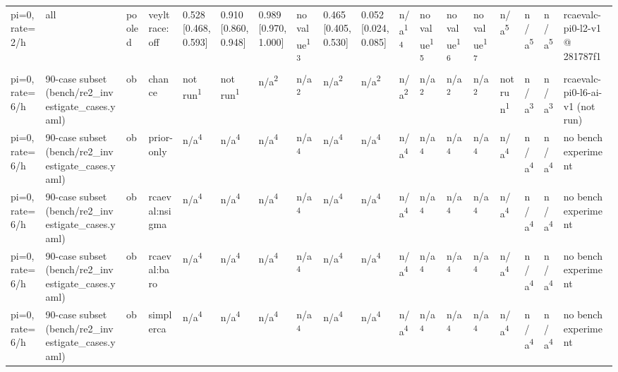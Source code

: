 \begin{table}[t]
\begin{tabular}{llllllllllllllllll}
pi=0, rate=2/h & all & pooled & veyltrace:off & 0.528 [0.468, 0.593] & 0.910 [0.860, 0.948] & 0.989 [0.970, 1.000] & no value\textsuperscript{13} & 0.465 [0.405, 0.530] & 0.052 [0.024, 0.085] & n/a\textsuperscript{14} & no value\textsuperscript{15} & no value\textsuperscript{16} & no value\textsuperscript{17} & n/a\textsuperscript{5} & n/a\textsuperscript{5} & n/a\textsuperscript{5} & rcaevalc-pi0-l2-v1 @ 281787f1 \\
pi=0, rate=6/h & 90-case subset (bench/re2\_investigate\_cases.yaml) & ob & chance & not run\textsuperscript{1} & not run\textsuperscript{1} & n/a\textsuperscript{2} & n/a\textsuperscript{2} & n/a\textsuperscript{2} & n/a\textsuperscript{2} & n/a\textsuperscript{2} & n/a\textsuperscript{2} & n/a\textsuperscript{2} & n/a\textsuperscript{2} & not run\textsuperscript{1} & n/a\textsuperscript{3} & n/a\textsuperscript{3} & rcaevalc-pi0-l6-ai-v1 (not run) \\
pi=0, rate=6/h & 90-case subset (bench/re2\_investigate\_cases.yaml) & ob & prior-only & n/a\textsuperscript{4} & n/a\textsuperscript{4} & n/a\textsuperscript{4} & n/a\textsuperscript{4} & n/a\textsuperscript{4} & n/a\textsuperscript{4} & n/a\textsuperscript{4} & n/a\textsuperscript{4} & n/a\textsuperscript{4} & n/a\textsuperscript{4} & n/a\textsuperscript{4} & n/a\textsuperscript{4} & n/a\textsuperscript{4} & no bench experiment \\
pi=0, rate=6/h & 90-case subset (bench/re2\_investigate\_cases.yaml) & ob & rcaeval:nsigma & n/a\textsuperscript{4} & n/a\textsuperscript{4} & n/a\textsuperscript{4} & n/a\textsuperscript{4} & n/a\textsuperscript{4} & n/a\textsuperscript{4} & n/a\textsuperscript{4} & n/a\textsuperscript{4} & n/a\textsuperscript{4} & n/a\textsuperscript{4} & n/a\textsuperscript{4} & n/a\textsuperscript{4} & n/a\textsuperscript{4} & no bench experiment \\
pi=0, rate=6/h & 90-case subset (bench/re2\_investigate\_cases.yaml) & ob & rcaeval:baro & n/a\textsuperscript{4} & n/a\textsuperscript{4} & n/a\textsuperscript{4} & n/a\textsuperscript{4} & n/a\textsuperscript{4} & n/a\textsuperscript{4} & n/a\textsuperscript{4} & n/a\textsuperscript{4} & n/a\textsuperscript{4} & n/a\textsuperscript{4} & n/a\textsuperscript{4} & n/a\textsuperscript{4} & n/a\textsuperscript{4} & no bench experiment \\
pi=0, rate=6/h & 90-case subset (bench/re2\_investigate\_cases.yaml) & ob & simplerca & n/a\textsuperscript{4} & n/a\textsuperscript{4} & n/a\textsuperscript{4} & n/a\textsuperscript{4} & n/a\textsuperscript{4} & n/a\textsuperscript{4} & n/a\textsuperscript{4} & n/a\textsuperscript{4} & n/a\textsuperscript{4} & n/a\textsuperscript{4} & n/a\textsuperscript{4} & n/a\textsuperscript{4} & n/a\textsuperscript{4} & no bench experiment \\

\end{tabular}
\end{table}

